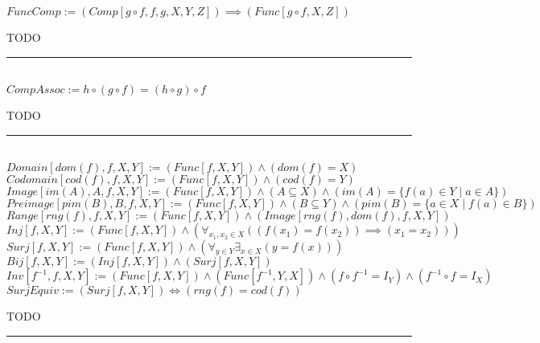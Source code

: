 \documentclass{book}
\newcommand{\abr}{:=}
\newcommand{\pr}[1]{\left(#1\right)}
\newcommand{\st}{\mathbin{|}}
\begin{document}
$FuncComp \abr (Comp[g \circ f, f, g, X, Y, Z]) \implies (Func[g \circ f, X, Z])$
\begin{enumerate}
  \lit TODO
\end{enumerate} \vspace{.75mm} \hrule \vspace{.75mm} \ \\

$CompAssoc \abr h \circ (g \circ f) = (h \circ g) \circ f$
\begin{enumerate}
  \lit TODO
\end{enumerate} \vspace{.75mm} \hrule \vspace{.75mm} \ \\

$Domain[dom(f), f, X, Y] \abr (Func[f, X, Y]) \land \pr{dom(f) = X}$ \\
$Codomain[cod(f), f, X, Y] \abr (Func[f, X, Y]) \land \pr{cod(f) = Y}$ \\
$Image[im(A), A, f, X, Y] \abr (Func[f, X, Y]) \land (A \subseteq X) \land \pr{im(A) = \{f(a) \in Y \st a \in A\}}$ \\
$Preimage[pim(B), B, f, X, Y] \abr (Func[f, X, Y]) \land (B \subseteq Y) \land \pr{pim(B) = \{a \in X \st f(a) \in B\}}$ \\
$Range[rng(f), f, X, Y] \abr (Func[f, X, Y]) \land \pr{Image[rng(f), dom(f), f, X, Y]}$ \\

$Inj[f, X, Y] \abr (Func[f, X, Y]) \land \pr{\forall_{x_1, x_2 \in X}\pr{\pr{f(x_1) = f(x_2)} \implies (x_1 = x_2)}}$ \\%
$Surj[f, X, Y] \abr (Func[f, X, Y]) \land \pr{\forall_{y \in Y} \exists_{x \in X}\pr{y = f(x)}}$ \\%
$Bij[f, X, Y] \abr (Inj[f, X, Y]) \land (Surj[f, X, Y])$ \\%
$Inv[f^{-1}, f, X, Y] \abr (Func[f, X, Y]) \land (Func[f^{-1}, Y, X]) \land (f \circ f^{-1} = I_Y) \land (f^{-1} \circ f = I_X)$ \\

$SurjEquiv \abr (Surj[f, X, Y]) \iff \pr{rng(f) = cod(f)}$ \\
\begin{enumerate}
  \lit TODO
\end{enumerate} \vspace{.75mm} \hrule \vspace{.75mm} \ \\
\end{document}
